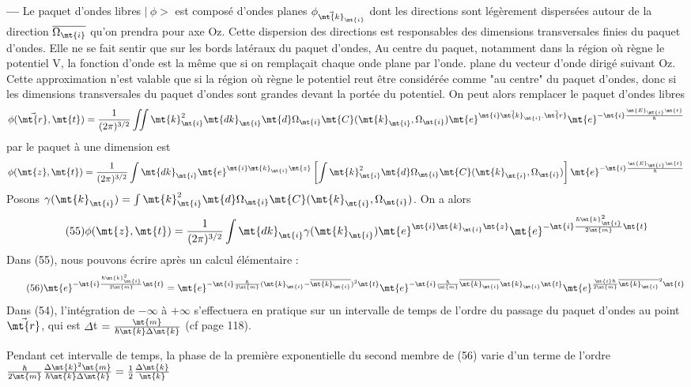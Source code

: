 {\bf—} Le paquet d'ondes libres $|\ \phi>$ est composé d'ondes planes $\phi_{\vec{\mt{k}}_\mt{i}}$ dont
les directions sont légèrement dispersées autour de la direction $\overline{\Omega_\mt{i}}$ qu'on
prendra pour axe Oz. Cette dispersion des directions est responsables des
dimensions transversales finies du paquet d'ondes. Elle ne se fait sentir
que sur les bords latéraux du paquet d'ondes, Au centre du paquet, notamment
dans la région où règne le potentiel V, la fonction d'onde est la
même que si on remplaçait chaque onde plane  par l'onde. plane du
vecteur d'onde  dirigé suivant Oz. Cette approximation n'est valable que
si la région où règne le potentiel reut être considérée comme "au centre"
du paquet d'ondes, donc si les dimensions transversales du paquet d'ondes
sont grandes devant la portée du potentiel. On peut alors remplacer le paquet d'ondes libres
\[
\phi(\vec{\mt{r}},\mt{ t})=\frac{1}{(2\pi)^{3/2}}\iint\mt{k}_\mt{i}^2\mt{ dk}_\mt{i}\mt{ d}\Omega_\mt{i}
\mt{ C}(\mt{k}_\mt{i},\Omega_\mt{i})\mt{ e}^{\mt{i}\vec{\mt{k}}_\mt{i}.\vec{\mt{r}}}
\mt{ e}^{-\mt{i}\frac{\mt{E}_\mt{i}\mt{t}}{\hbar}}
\]
par le paquet à une dimension est
\[
\phi(\mt{z},\mt{ t})=\frac{1}{(2\pi)^{3/2}}\int\mt{dk}_\mt{i}\mt{ e}^{\mt{i}\mt{ k}_\mt{i}\mt{ z}}
\left[\int\mt{k}_\mt{i}^2\mt{ d}\Omega_\mt{i}\mt{ C}(\mt{k}_\mt{i},\Omega_\mt{i})\right]
\mt{ e}^{-\mt{i}\frac{\mt{E}_\mt{i}\mt{t}}{\hbar}}
\]
Posons $\gamma(\mt{k}_\mt{i})=\int\mt{k}_\mt{i}^2\mt{ d}\Omega_\mt{i}\mt{ C}(\mt{k}_\mt{i},\Omega_\mt{i})$.
On a alors
\[
\tag{55}\phi(\mt{z},\mt{ t})=\frac{1}{(2\pi)^{3/2}}\int\mt{dk}_\mt{i }\gamma(\mt{k}_\mt{i})
\mt{ e}^{\mt{i}\mt{ k}_\mt{i}\mt{ z}}\mt{ e}^{-\mt{i}\frac{\hbar\mt{ k}_\mt{i}^2}{2\mt{m}}\mt{t}}
\]
Dans (55), nous pouvons écrire après un calcul élémentaire :
\[
\tag{56}\mt{e}^{-\mt{i}\frac{\hbar\mt{ k}_\mt{i}^2}{2\mt{m}}\mt{t}}=
\mt{e}^{-\mt{i}\frac{\hbar}{2\mt{m}}(\mt{ k}_\mt{i}-\overline{\mt{k}_\mt{i}})^2\mt{t}}
\mt{ e}^{-\mt{i}\frac{\hbar}{\mt{m}}\overline{\mt{k}_\mt{i}}\mt{ k}_\mt{i}\mt{t}}
\mt{ e}^{\frac{\mt{i}\hbar}{2\mt{m}}\overline{\mt{ k}_\mt{i}}^2\mt{t}}
\]
Dans (54), l'intégration de $-\infty$ à $+\infty$ s'effectuera en pratique sur un
intervalle de temps de l'ordre du passage du paquet d'ondes au point $\vec{\mt{r}}$,
qui est $\Delta$t $=\frac{\mt{m}}{\hbar\mt{k}\Delta\mt{k}}$ (cf page 118).

Pendant cet intervalle de temps, la phase de la première exponentielle du
second membre de (56) varie d'un terme de l'ordre $\frac{\hbar}{2\mt{m}}\frac{\Delta\mt{k}^2\mt{m}}{\hbar\mt{k}\Delta\mt{k}}=\frac{1}{2}\frac{\Delta\mt{k}}{\mt{k}}$

